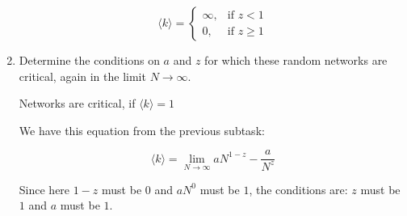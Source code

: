 \begin{enumerate}
	\[
		\langle k \rangle = 
			\begin{cases}
	   			\infty, & \text{if } z < 1\\
	   			0, & \text{if }z \geq 1
			\end{cases}
	\]

	\item Determine the conditions on $a$ and $z$ for which these random networks are critical,  again in the limit $N \rightarrow \infty$.
	
	Networks are critical, if $\langle k \rangle = 1$
	
	We have this equation from the previous subtask: 
	
	\begin{equation}
		\langle k \rangle = \lim\limits_{N \rightarrow \infty} aN^{1-z} - \frac{a}{N^z}
	\end{equation}
	
	Since here $1-z$ must be $0$ and $aN^0$ must be $1$, the conditions are:  $z$ must be $1$ and $a$ must be $1$.
	
\end{enumerate}
